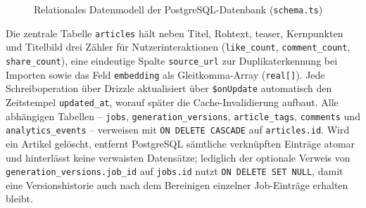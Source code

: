\begin{figure}
    \caption{Relationales Datenmodell der PostgreSQL-Datenbank (\texttt{schema.ts})}
    \label{fig:backend:schema}
\end{figure}

Die zentrale Tabelle \texttt{articles} hält neben Titel, Rohtext, \gls{teaser}, Kernpunkten und Titelbild drei Zähler für Nutzerinteraktionen (\texttt{like\_count}, \texttt{comment\_count}, \texttt{share\_count}), eine eindeutige Spalte \texttt{source\_url} zur Duplikaterkennung bei Importen sowie das Feld \texttt{embedding} als Gleitkomma-Array (\texttt{real[]}).
Jede Schreiboperation über Drizzle aktualisiert über \texttt{\$onUpdate} automatisch den Zeitstempel \texttt{updated\_at}, worauf später die Cache-Invalidierung aufbaut.
Alle abhängigen Tabellen – \texttt{jobs}, \texttt{generation\_versions}, \texttt{article\_tags}, \texttt{comments} und \texttt{analytics\_events} – verweisen mit \texttt{ON DELETE CASCADE} auf \texttt{articles.id}.
Wird ein Artikel gelöscht, entfernt PostgreSQL sämtliche verknüpften Einträge atomar und hinterlässt keine verwaisten Datensätze; lediglich der optionale Verweis von \texttt{generation\_versions.job\_id} auf \texttt{jobs.id} nutzt \texttt{ON DELETE SET NULL}, damit eine Versionshistorie auch nach dem Bereinigen einzelner Job-Einträge erhalten bleibt.

